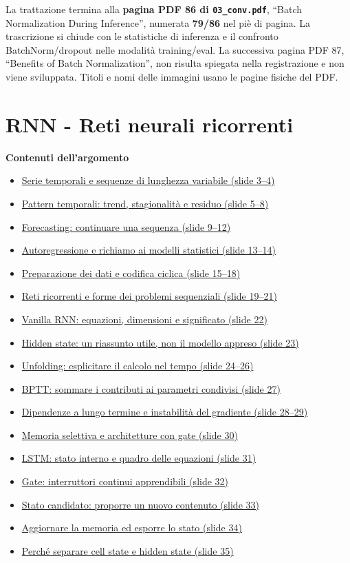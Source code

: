 \documentclass[11pt,a4paper,oneside,openany]{book}
\renewenvironment{quote}{\list{}{\leftmargin=1em\rightmargin=0pt}\item\relax}{\endlist}
\newenvironment{indiceargomento}{\begingroup\small\sffamily\color{grigio}\textbf{Contenuti dell'argomento}\par\begin{itemize}\setlength{\itemsep}{0pt}\setlength{\parskip}{0pt}}{\end{itemize}\endgroup\medskip}
\begin{document}
\begin{quote}
La trattazione termina alla \textbf{pagina PDF 86 di \texttt{03\_conv.pdf}}, ``Batch Normalization During Inference'', numerata \textbf{79/86} nel piè di pagina. La trascrizione si chiude con le statistiche di inferenza e il confronto BatchNorm/dropout nelle modalità training/eval. La successiva pagina PDF 87, ``Benefits of Batch Normalization'', non risulta spiegata nella registrazione e non viene sviluppata. Titoli e nomi delle immagini usano le pagine fisiche del PDF.
\end{quote}


\chapter{RNN - Reti neurali ricorrenti}\label{fonte03}

\begin{indiceargomento}
\item \hyperref[f03-r34]{Serie temporali e sequenze di lunghezza variabile (slide 3--4)}
\item \hyperref[f03-r66]{Pattern temporali: trend, stagionalità e residuo (slide 5--8)}
\item \hyperref[f03-r106]{Forecasting: continuare una sequenza (slide 9--12)}
\item \hyperref[f03-r139]{Autoregressione e richiamo ai modelli statistici (slide 13--14)}
\item \hyperref[f03-r172]{Preparazione dei dati e codifica ciclica (slide 15--18)}
\item \hyperref[f03-r230]{Reti ricorrenti e forme dei problemi sequenziali (slide 19--21)}
\item \hyperref[f03-r248]{Vanilla RNN: equazioni, dimensioni e significato (slide 22)}
\item \hyperref[f03-r346]{Hidden state: un riassunto utile, non il modello appreso (slide 23)}
\item \hyperref[f03-r384]{Unfolding: esplicitare il calcolo nel tempo (slide 24--26)}
\item \hyperref[f03-r410]{BPTT: sommare i contributi ai parametri condivisi (slide 27)}
\item \hyperref[f03-r547]{Dipendenze a lungo termine e instabilità del gradiente (slide 28--29)}
\item \hyperref[f03-r638]{Memoria selettiva e architetture con gate (slide 30)}
\item \hyperref[f03-r648]{LSTM: stato interno e quadro delle equazioni (slide 31)}
\item \hyperref[f03-r687]{Gate: interruttori continui apprendibili (slide 32)}
\item \hyperref[f03-r741]{Stato candidato: proporre un nuovo contenuto (slide 33)}
\item \hyperref[f03-r762]{Aggiornare la memoria ed esporre lo stato (slide 34)}
\item \hyperref[f03-r838]{Perché separare cell state e hidden state (slide 35)}
\end{indiceargomento}
\end{document}
